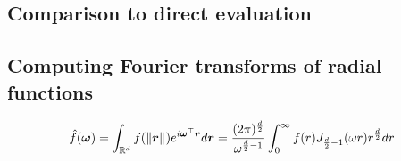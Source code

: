 \subsection{Comparison to direct evaluation}

\subsection{Computing Fourier transforms of radial functions}

\begin{equation*}
    \hat{f}(\bm{\omega}) 
    = \int_{\mathbb{R}^d} f(\left\Vert\bm{r}\right\Vert_{}) e^{i\bm{\omega}^\top \bm{r}} d\bm{r}
    = \frac{(2\pi)^{\frac{d}{2}}}{\omega^{\frac{d}{2} - 1}} \int_0^\infty f(r) J_{\frac{d}{2} - 1}(\omega r) r^{\frac{d}{2}} dr
  \end{equation*}

